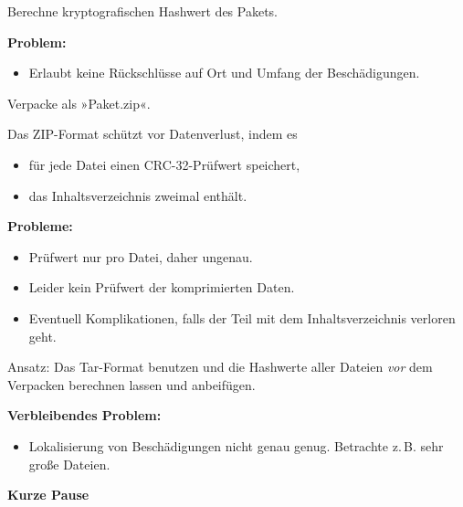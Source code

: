 \documentclass{beamer}
\newcommand{\strong}[1]{\textsf{\textbf{#1}}}
\begin{document}
\begin{frame}[t]
\vspace{2em}
Berechne kryptografischen Hashwert des Pakets.\pause

\vspace{2em}
\strong{Problem:}
\begin{itemize}
\item Erlaubt keine Rückschlüsse auf Ort und Umfang der
  Beschädigungen.
\end{itemize}
\end{frame}

\begin{frame}[t]
\vspace{2em}
Verpacke als »Paket.zip«. 

\vspace{1em}
Das ZIP-Format schützt vor Datenverlust, indem es
\begin{itemize}
\item für jede Datei einen CRC-32-Prüfwert speichert,
\item das Inhaltsverzeichnis zweimal enthält.
\end{itemize}\pause

\vspace{1em}
\strong{Probleme:}
\begin{itemize}
\item Prüfwert nur pro Datei, daher ungenau.
\item Leider kein Prüfwert der komprimierten Daten.
\item Eventuell Komplikationen, falls der Teil mit dem
  Inhaltsverzeichnis verloren geht.
\end{itemize}
\end{frame}

\begin{frame}[t]
\vspace{2em}
Ansatz: Das Tar-Format benutzen und die Hashwerte aller Dateien
\emph{vor} dem Verpacken berechnen lassen und anbeifügen.\pause

\vspace{1em}
\strong{Verbleibendes Problem:}
\begin{itemize}
\item Lokalisierung von Beschädigungen nicht genau genug.
Betrachte z.\,B. sehr große Dateien.
\end{itemize}
\end{frame}

\begin{frame}
\begin{center}
\strong{Kurze Pause}
\end{center}
\end{frame}
\end{document}
